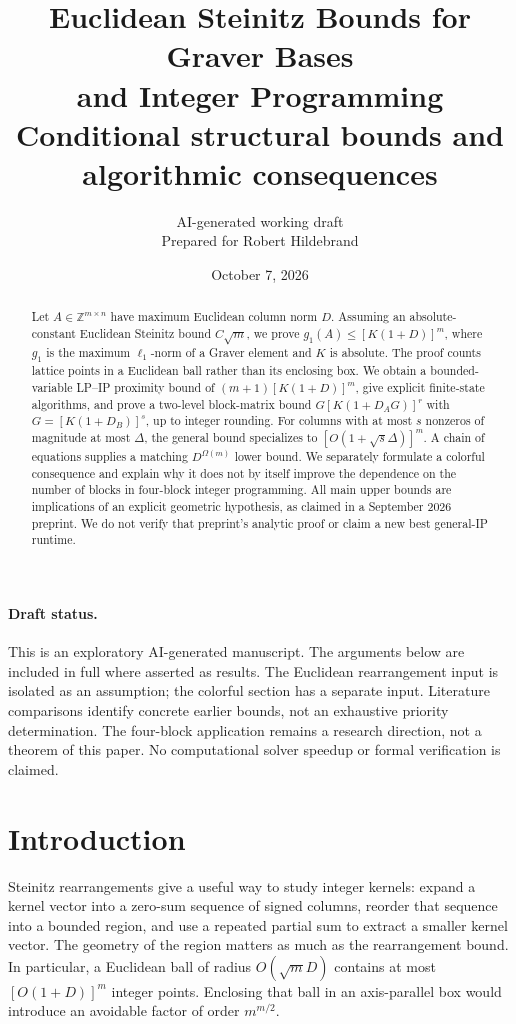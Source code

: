 \documentclass[11pt]{article}
\title{Euclidean Steinitz Bounds for Graver Bases\\and Integer Programming\\[0.4em]
\large Conditional structural bounds and algorithmic consequences}
\author{AI-generated working draft\\Prepared for Robert Hildebrand}
\date{October 7, 2026}
\theoremstyle{definition}
\theoremstyle{remark}
\newcommand{\Z}{\mathbb Z}
\begin{document}
\maketitle
\begin{abstract}
Let $A\in\Z^{m\times n}$ have maximum Euclidean column norm $D$.
Assuming an absolute-constant Euclidean Steinitz bound $C\sqrt m$, we
prove $g_1(A)\le [K(1+D)]^m$, where $g_1$ is the maximum $\ell_1$-norm
of a Graver element and $K$ is absolute. The proof counts lattice points
in a Euclidean ball rather than its enclosing box. We obtain a
bounded-variable LP--IP proximity bound of $(m+1)[K(1+D)]^m$, give explicit
finite-state algorithms, and prove a two-level block-matrix bound
$G[K(1+D_A G)]^r$ with $G=[K(1+D_B)]^s$, up to integer rounding.
For columns with at most $s$ nonzeros of magnitude at most $\Delta$, the
general bound specializes to $[O(1+\sqrt{s}\Delta)]^m$.
A chain of equations supplies a matching $D^{\Omega(m)}$ lower bound.
We separately formulate a colorful consequence and explain why it does
not by itself improve the dependence on the number of blocks in four-block
integer programming. All main upper bounds are implications of an explicit
geometric hypothesis, as claimed in a September 2026 preprint. We do not
verify that preprint's analytic proof or claim a new best general-IP runtime.
\end{abstract}

\paragraph{Draft status.}
This is an exploratory AI-generated manuscript. The arguments below are
included in full where asserted as results. The Euclidean rearrangement
input is isolated as an assumption; the colorful section has a separate
input. Literature comparisons identify concrete earlier bounds, not an
exhaustive priority determination. The four-block application remains a
research direction, not a theorem of this paper. No computational solver
speedup or formal verification is claimed.

\section{Introduction}

Steinitz rearrangements give a useful way to study integer kernels: expand
a kernel vector into a zero-sum sequence of signed columns, reorder that
sequence into a bounded region, and use a repeated partial sum to extract
a smaller kernel vector. The geometry of the region matters as much as
the rearrangement bound. In particular, a Euclidean ball of radius
$O(\sqrt m D)$ contains at most $[O(1+D)]^m$ integer points. Enclosing
that ball in an axis-parallel box would introduce an avoidable factor
of order $m^{m/2}$.
\end{document}
